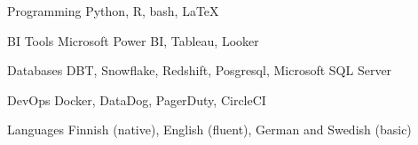

\begin{cvskills}

  \cvskill
    {Programming} %
    {Python, R, bash, LaTeX} %

  \cvskill
    {BI Tools} %
    {Microsoft Power BI, Tableau, Looker} %

  \cvskill
    {Databases} %
    {DBT, Snowflake, Redshift, Posgresql, Microsoft SQL Server} %

  \cvskill
    {DevOps} %
    {Docker, DataDog, PagerDuty, CircleCI} %

  \cvskill
    {Languages} %
    {Finnish (native), English (fluent), German and Swedish (basic)} %

\end{cvskills}
